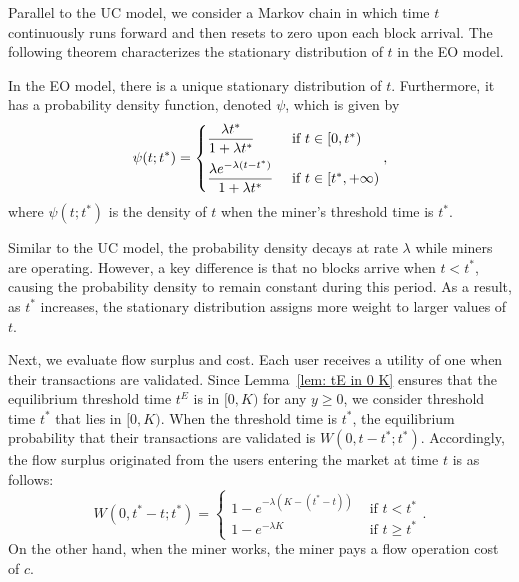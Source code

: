 \documentclass[12pt, letterpaper]{article}
\begin{document}
Parallel to the UC model, we consider a Markov chain in which time $t$ continuously runs forward and then resets to zero upon each block arrival. The following theorem characterizes the stationary distribution of $t$ in the EO model.

\begin{prop}\label{prop: stationary distribution endogenous operation model}
    In the EO model, there is a unique stationary distribution of $t$. Furthermore, it has a probability density function, denoted $\psi$, which is given by
    \begin{equation}
    \psi(t; t^*) = \begin{cases}
        \dfrac{\lambda t^*}{1 + \lambda t^*} & \text{ if } t \in [0, t^*) \vspace{0.5em}\\
        \dfrac{\lambda e^{-\lambda (t - t^*)}}{1 + \lambda t^*} & \text{ if } t \in [t^*, +\infty)
    \end{cases},
    \end{equation}
    where $\psi(t;t^*)$ is the density of $t$ when the miner's threshold time is $t^*$.
\end{prop}

Similar to the UC model, the probability density decays at rate $\lambda$ while miners are operating. However, a key difference is that no blocks arrive when $t < t^*$, causing the probability density to remain constant during this period. As a result, as $t^*$ increases, the stationary distribution assigns more weight to larger values of $t$.


Next, we evaluate flow surplus and cost. Each user receives a utility of one when their transactions are validated. Since Lemma~\ref{lem: tE in 0 K} ensures that the equilibrium threshold time $t^E$ is in $[0, K)$ for any $y \ge 0$, we consider threshold time $t^*$ that lies in $[0, K)$. When the threshold time is $t^*$, the equilibrium probability that their transactions are validated is $W(0, t - t^*; t^*)$. Accordingly, the flow surplus originated from the users entering the market at time $t$ is as follows:
\begin{equation}
     W(0, t^* - t; t^*) = \begin{cases}
        1 - e^{-\lambda (K - (t^* - t))} & \text{ if } t < t^*\\
        1 - e^{-\lambda K} & \text{ if } t \ge t^*
    \end{cases}.
\end{equation}
On the other hand, when the miner works, the miner pays a flow operation cost of $c$.
\end{document}
